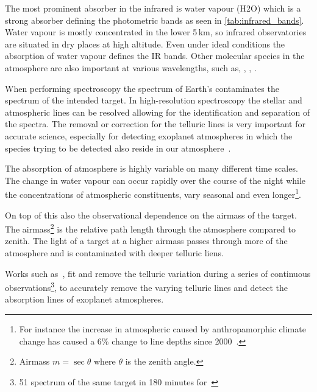 

The most prominent absorber in the infrared is water vapour (\si{H2O}) which is a strong absorber defining the photometric bands as seen in \cref{tab:infrared_bands}.
Water vapour is mostly concentrated in the lower 5\,\si{\kilo\metre}, so infrared observatories are situated in dry places at high altitude.
Even under ideal conditions the absorption of water vapour defines the IR bands.
Other molecular species in the atmosphere are also important at various wavelengths, such as, , , .

When performing spectroscopy the spectrum of Earth's contaminates the spectrum of the intended target.
In high-resolution spectroscopy the stellar and atmospheric lines can be resolved allowing for the identification and separation of the spectra.
The removal or correction for the telluric lines is very important for accurate science, especially for detecting exoplanet atmospheres in which the species trying to be detected also reside in our atmosphere~\citep{snellen_orbital_2010, brogi_carbon_2014, dekok_detection_2013}.

The absorption of atmosphere is highly variable on many different time scales.
The change in water vapour can occur rapidly over the course of the night while the concentrations of atmospheric constituents, vary seasonal and even longer\footnote{For instance the increase in atmospheric  caused by anthropamorphic climate change has caused a 6\% change to  line depths since 2000~\citep{smette_molecfit_2015}.}.

On top of this also the observational dependence on the airmass of the target.
The airmass\footnote{Airmass $m=\sec{\theta}$ where $\theta$ is the zenith angle.} is the relative path length through the atmosphere compared to zenith.
The light of a target at a higher airmass passes through more of the atmosphere and is contaminated with deeper telluric liens.

Works such as~\citet{snellen_orbital_2010}, fit and remove the telluric variation during a series of continuous observations\footnote{51 spectrum of the same target in 180 minutes for~\citet{snellen_orbital_2010}}, to accurately remove the varying telluric lines and detect the absorption lines of exoplanet atmospheres.


